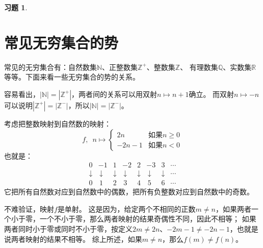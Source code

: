 \documentclass[12pt,UTF8]{ctexbook}
\newtheorem{xt}{习题}[section]
\begin{document}
\begin{xt}
    
    
\end{xt}

\section{常见无穷集合的势}

常见的无穷集合有：自然数集$\mathbb{N}$、正整数集$\mathbb{Z}^+$、整数集$\mathbb{Z}$、
有理数集$\mathbb{Q}$、实数集$\mathbb{R}$等等。下面来看一些无穷集合的势的关系。

容易看出，$|\mathbb{N}| = |\mathbb{Z}^+|$，两者间的关系可以用双射$n\mapsto n + 1$确立。
而双射$n \mapsto -n$可以说明$|\mathbb{Z}^+| = |\mathbb{Z}^-|$，所以$|\mathbb{N}| = |\mathbb{Z}^-|$。

考虑把整数映射到自然数的映射：
$$ f,\,\,\,n\mapsto \left\{
    \begin{array}{cl}
        2n & \mbox{如果}n \geqslant 0 \\
        -2n - 1  & \mbox{如果}n < 0 
    \end{array}\right.
$$
也就是：
$$ \begin{array}{cccccccc}
        0 & -1 & 1 & -2 & 2 & -3 & 3 & \cdots \\
        \downarrow & \,\downarrow & \downarrow & \,\downarrow & \downarrow & \,\downarrow & \downarrow & \cdots \\
        0 & \,1 & 2 & \,3 & 4 & \,5 & 6 & \cdots 
    \end{array}
$$
它把所有自然数对应到自然数中的偶数，把所有负整数对应到自然数中的奇数。

不难验证，映射$f$是单射。
这是因为，给定两个不相同的正数$m \neq n$，如果两者一个小于零，一个不小于零，那么两者映射的结果奇偶性不同，因此不相等；
如果两者同时小于零或同时不小于零，按定义$2m \neq 2n$、$-2m - 1 \neq -2n - 1$，也就是说两者映射的结果不相等。
综上所述，如果$m \neq n$，那么$f(m) \neq f(n)$。
\end{document}
